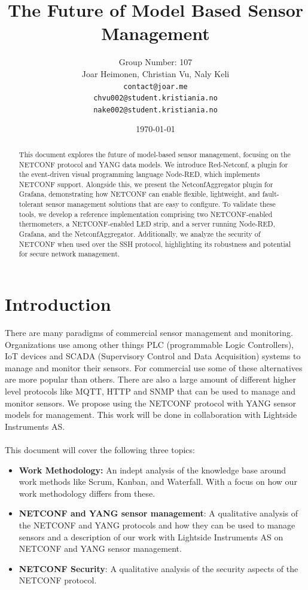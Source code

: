 \documentclass[12pt]{article}
\author{
    Group Number: 107\\
    Joar Heimonen, Christian Vu, Naly Keli \\
    \texttt{contact@joar.me}\\ 
    \texttt{chvu002@student.kristiania.no}\\
    \texttt{nake002@student.kristiania.no}
}
\title{
  \textbf{The Future of Model Based Sensor Management}\\
}
\date{\today}
\begin{document}
\maketitle

\begin{abstract}
  This document explores the future of model-based sensor management, focusing on the NETCONF protocol and YANG data models. We introduce Red-Netconf,
  a plugin for the event-driven visual programming language Node-RED, which implements NETCONF support. Alongside this, we present the NetconfAggregator 
  plugin for Grafana, demonstrating how NETCONF can enable flexible, lightweight, and fault-tolerant sensor management solutions that are easy to configure.
  To validate these tools, we develop a reference implementation comprising two NETCONF-enabled thermometers, a NETCONF-enabled LED strip, and a server 
  running Node-RED, Grafana, and the NetconfAggregator. Additionally, we analyze the security of NETCONF when used over the SSH protocol, 
  highlighting its robustness and potential for secure network management.
\end{abstract}

\pagebreak

\tableofcontents

\pagebreak


\section{Introduction}
There are many paradigms of commercial sensor management and monitoring. Organizations use among other things
PLC (programmable Logic Controllers), IoT devices and SCADA (Supervisory Control and Data Acquisition) systems to 
manage and monitor their sensors. For commercial use 
some of these alternatives are more popular than others. There are also a large amount of different higher level protocols
like MQTT, HTTP and SNMP that can be used to manage and monitor sensors. We propose using the NETCONF protocol 
with YANG sensor models for management. This work will be done in collaboration with Lightside Instruments AS.
\\
\\
This document will cover the following three topics:
\begin{itemize}
  \item \textbf{Work Methodology:} An indept analysis of the knowledge base around work methods like Scrum, Kanban, and Waterfall. 
  With a focus on how our work methodology differs from these.
  \item \textbf{NETCONF and YANG sensor management}: A qualitative analysis of the NETCONF and YANG protocols and how they can be used to manage sensors and 
  a description of our work with Lightside Instruments AS on NETCONF and YANG sensor management.
  \item \textbf{NETCONF Security}: A qualitative analysis of the security aspects of the NETCONF protocol.
\end{itemize}
\end{document}
